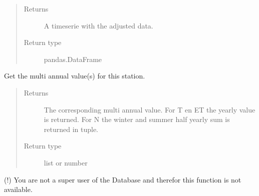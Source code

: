 \documentclass[letterpaper,10pt,english]{sphinxmanual}
\begin{document}
\begin{fulllineitems}
\begin{fulllineitems}
\begin{quote}
\begin{description}
\item[{Returns}] \leavevmode
\sphinxAtStartPar
A timeserie with the adjusted data.

\item[{Return type}] \leavevmode
\sphinxAtStartPar
pandas.DataFrame

\end{description}\end{quote}

\end{fulllineitems}


\begin{fulllineitems}
\label{\detokenize{weatherDB:weatherDB.station.TemperatureStation.get_multi_annual}}
\sphinxAtStartPar
Get the multi annual value(s) for this station.
\begin{quote}\begin{description}
\item[{Returns}] \leavevmode
\sphinxAtStartPar
The corresponding multi annual value.
For T en ET the yearly value is returned.
For N the winter and summer half yearly sum is returned in tuple.

\item[{Return type}] \leavevmode
\sphinxAtStartPar
list or number

\end{description}\end{quote}

\end{fulllineitems}


\end{fulllineitems}


\begin{fulllineitems}
\label{\detokenize{weatherDB:weatherDB.station.prop_disallow}}
\sphinxAtStartPar
(!) You are not a super user of the Database and therefor this function is not available.

\end{fulllineitems}
\end{document}
